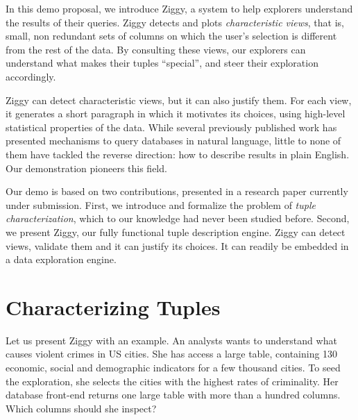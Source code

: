 In this demo proposal, we introduce Ziggy, a system to help explorers
understand the results of their queries.  Ziggy detects and plots \emph{characteristic
views}, that is, small, non redundant sets of columns on which the user's
selection is different from the rest of the data. By consulting these views,
our explorers can understand what makes their tuples ``special'', and steer
their exploration accordingly.

Ziggy can detect characteristic views, but it can also justify them. For each
view, it generates a short paragraph in which it motivates its choices, using
high-level statistical properties of the data.  While several previously
published work has presented mechanisms to query databases in natural language,
little to none of them have tackled the reverse direction: how to describe
results in plain English. Our demonstration pioneers this field.

Our demo is based on two contributions, presented in a research paper currently
under submission. First, we introduce and formalize the problem of \emph{tuple
characterization}, which to our knowledge had never been studied before.
Second, we present Ziggy, our fully functional tuple description engine. Ziggy
can detect views, validate them and it can justify its choices. It can readily
be embedded in a data exploration engine.

\section{Characterizing Tuples}
\label{sec:overview}

Let us present Ziggy with an example. An analysts wants to understand what
causes violent crimes in US cities. She has access a large table, containing
130 economic, social and demographic indicators for a few thousand cities. To
seed the exploration, she selects the cities with the highest rates of
criminality. Her database front-end returns one large table with more than a
hundred columns. Which columns should she inspect?

